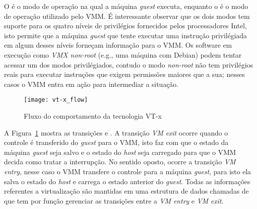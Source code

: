 O  é o modo de operação na qual a máquina
\emph{guest} executa, enquanto o  é o modo de operação utilizado
pelo VMM. É interessante observar que os dois modos tem suporte para os quatro
níveis de privilégios fornecidos pelos processadores Intel, isto permite que a
máquina \emph{guest} que tente executar uma instrução privilégiada em algum
desses níveis forneçam informação para o VMM. Os software em execução como
\emph{VMX non-root} (e.g., uma máquina com Debian) podem tentar acessar um dos
modos privilégiados, contudo o modo \emph{non-root} não tem privilégios reais
para executar instruções que exigem permissões maiores que a sua; nesses casos
o VMM entra em ação para intermediar a situação.

\begin{figure}[!h]
  \centering
  \texttt{[image: vt-x\_flow]} 
  \caption{Fluxo do comportamento da tecnologia VT-x}
  \label{fig:vt-x_flow}
\end{figure}

A Figura~\ref{fig:vt-x_flow} mostra as transições  e
. A transição \emph{VM exit} ocorre quando o controle é
transferido do \emph{guest} para o VMM, isto faz com que o estado da máquina
\emph{guest} seja salvo e o estado do \emph{host} seja carregado para que o VMM
decida como tratar a interrupção. No sentido oposto, ocorre a transição
\emph{VM entry}, nesse caso o VMM transfere o controle para a máquina
\emph{guest}, para isto ela salva o estado do \emph{host} e carrega o estado
anterior do \emph{guest}. Todas as informações referentes a virtualização são
mantidas em uma estrutura de dados chamadas de  que tem por função gerenciar as transições entre a
\emph{VM entry} e \emph{VM exit}.

